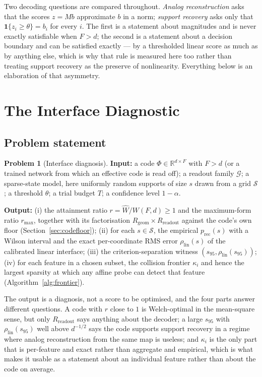 \documentclass[preprint,12pt]{elsarticle}
\theoremstyle{definition}
\newtheorem{problem}[theorem]{Problem}
\newcommand{\R}{\mathbb{R}}
\begin{document}
Two decoding questions are compared throughout. \emph{Analog reconstruction} asks that the
scores $z=Mb$ approximate $b$ in a norm; \emph{support recovery} asks only that
$\mathbf 1\{z_i\ge\theta\}=b_i$ for every $i$. The first is a statement about magnitudes and is
never exactly satisfiable when $F>d$; the second is a statement about a decision boundary and
can be satisfied exactly --- by a thresholded linear score as much as by anything else, which
is why that rule is measured here too rather than treating support recovery as the preserve of
nonlinearity. Everything below is an elaboration of that asymmetry.

\section{The Interface Diagnostic}
\label{sec:method}

\subsection{Problem statement}

\begin{problem}[Interface diagnosis]
\label{prob:main}
\textbf{Input:} a code $\Phi\in\R^{d\times F}$ with $F>d$ (or a trained network from which an
effective code is read off); a readout family $\mathcal G$; a sparse-state model, here
uniformly random supports of size $s$ drawn from a grid $\mathcal S$; a threshold $\theta$; a
trial budget $T$; a confidence level $1-\alpha$.

\textbf{Output:} (i) the attainment ratio $r=\widehat W/W(F,d)\ge1$ and the maximum-form ratio
$r_{\max}$, together with its factorisation $R_{\mathrm{geom}}\times R_{\mathrm{readout}}$
against the code's own floor (Section~\ref{sec:codefloor}); (ii) for each $s\in\mathcal S$, the
empirical $p_{\mathrm{rec}}(s)$ with a Wilson interval and the exact per-coordinate RMS error
$\rho_{\mathrm{lin}}(s)$ of the calibrated linear interface; (iii) the criterion-separation
witness $(s_{95},\rho_{\mathrm{lin}}(s_{95}))$; (iv) for each feature in a chosen subset, the
collision frontier $\kappa_i$ and hence the largest sparsity at which any affine probe can
detect that feature (Algorithm~\ref{alg:frontier}).
\end{problem}

The output is a diagnosis, not a score to be optimised, and the four parts answer different
questions. A code with $r$ close to $1$ is Welch-optimal in the mean-square sense, but only
$R_{\mathrm{readout}}$ says anything about the decoder; a large $s_{95}$ with
$\rho_{\mathrm{lin}}(s_{95})$ well above $d^{-1/2}$ says the code supports support recovery in a
regime where analog reconstruction from the same map is useless; and $\kappa_i$ is the only part
that is per-feature and exact rather than aggregate and empirical, which is what makes it usable
as a statement about an individual feature rather than about the code on average.
\end{document}
